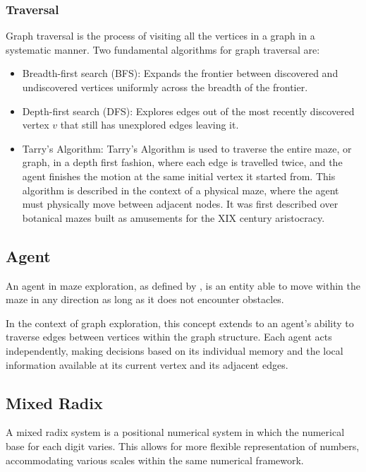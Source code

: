 \subsubsection{Traversal}

Graph traversal is the process of visiting all the vertices in a graph in a systematic manner. Two fundamental algorithms for graph traversal are:

\begin{itemize}
    \item Breadth-first search (BFS): Expands the frontier between discovered and undiscovered vertices uniformly across the breadth of the frontier. \cite{Manber1989}
    \item Depth-first search (DFS): Explores edges out of the most recently discovered vertex $v$ that still has unexplored edges leaving it. \cite{Manber1989}
    \item Tarry's Algorithm: Tarry's Algorithm is used to traverse the entire maze, or graph, in a depth first fashion, where each edge is travelled twice, and the agent finishes the motion at the same initial vertex it started from.\cite{Kivelevitch2010} This algorithm is described in the context of a physical maze, where the agent must physically move between adjacent nodes.
    It was first described over botanical mazes built as amusements for the XIX century aristocracy.
\end{itemize}

\subsection{Agent}
\label{section_definitions_agent}

An agent in maze exploration, as defined by , 
is an entity able to move within the maze in any direction as long as it does not encounter obstacles.

In the context of graph exploration, this concept extends to an agent's ability to traverse
edges between vertices within the graph structure. Each agent acts independently,
making decisions based on its individual memory and the local information available at its current vertex and its adjacent edges.


\subsection{Mixed Radix}
\label{section_definitions_mixed_radix}

A mixed radix system is a positional numerical system in which the numerical base for each digit
varies. This allows for more flexible representation of numbers,
accommodating various scales within the same numerical framework.

